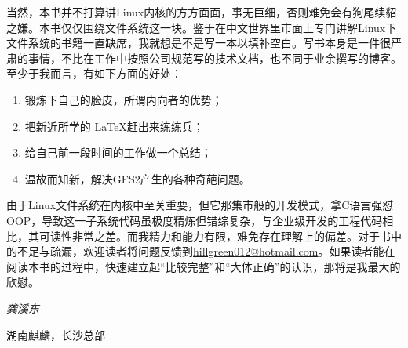 当然，本书并不打算讲Linux内核的方方面面，事无巨细，否则难免会有狗尾续貂之嫌。本书仅仅围绕文件系统这一块。鉴于在中文世界里市面上专门讲解Linux下文件系统的书籍一直缺席，我就想是不是写一本以填补空白。写书本身是一件很严肃的事情，不比在工作中按照公司规范写的技术文档，也不同于业余撰写的博客。至少于我而言，有如下方面的好处：
\begin{enumerate}
	\item 锻炼下自己的脸皮，所谓内向者的优势；
	\item 把新近所学的 \LaTeX 赶出来练练兵；
	\item 给自己前一段时间的工作做一个总结；
	\item 温故而知新，解决GFS2产生的各种奇葩问题。
\end{enumerate}

由于Linux文件系统在内核中至关重要，但它那集市般的开发模式，拿C语言强怼OOP，导致这一子系统代码虽极度精炼但错综复杂，与企业级开发的工程代码相比，其可读性非常之差。而我精力和能力有限，难免存在理解上的偏差。对于书中的不足与疏漏，欢迎读者将问题反馈到\href{hillgreen012@hotmail.com}{hillgreen012@hotmail.com}。如果读者能在阅读本书的过程中，快速建立起``比较完整''和``大体正确''的认识，那将是我最大的欣慰。

\begin{flushright}
	\textit{龚溪东}

	湖南麒麟，长沙总部
\end{flushright}
